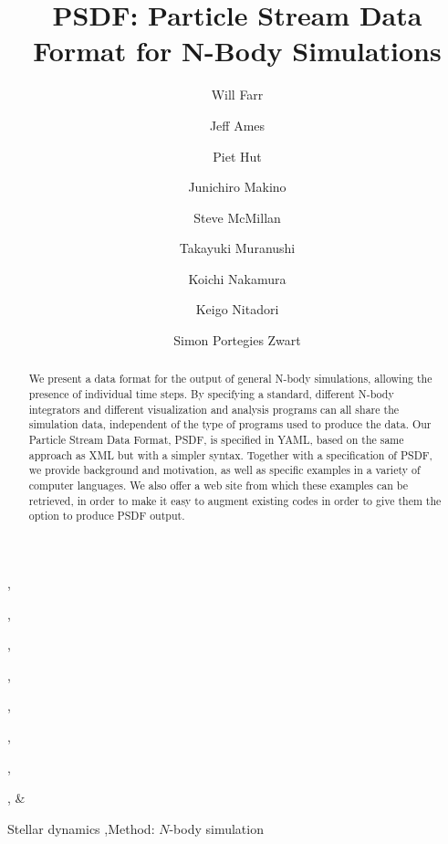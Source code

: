 \documentclass{elsart5p}
\begin{document}
\begin{frontmatter}



\title{PSDF: Particle Stream Data Format for N-Body Simulations}


\author[xx1]{Will Farr},
\author[xx2]{Jeff Ames},
\author[Princeton]{Piet Hut},
\author[UTokyoTech]{Junichiro Makino},
\author[xx3]{Steve McMillan},
\author[xx4]{Takayuki Muranushi},
\author[xx5]{Koichi Nakamura},
\author[xx6]{Keigo Nitadori}, \&
\author[xx7]{Simon Portegies Zwart}

\address[UTokyoTech]{Interactive Research Center of Science, Graduate
  School of Science and Engineering Tokyo Institute of Technology,
  2--12--1 Ookayama, Meguro, Tokyo 152-8551, Japan}
\address[Princeton]{Institute for Advanced Study, Princeton, NJ 08540,
  USA}
\address[xx1]{xxx xxx xxx}
\address[xx2]{xxx xxx xxx}
\address[xx3]{xxx xxx xxx}
\address[xx4]{xxx xxx xxx}
\address[xx5]{xxx xxx xxx}
\address[xx6]{xxx xxx xxx}
\address[xx7]{xxx xxx xxx}

\begin{abstract}
  We present a data format for the output of general N-body simulations,
  allowing the presence of individual time steps.  By specifying a standard,
  different N-body integrators and different visualization and analysis
  programs can all share the simulation data, independent of the type of
  programs used to produce the data.  Our Particle Stream Data Format,
  PSDF, is specified in YAML, based on the same approach as XML but
  with a simpler syntax.  Together with a specification of PSDF, we
  provide background and motivation, as well as specific examples in a
  variety of computer languages.  We also offer a web site from which
  these examples can be retrieved, in order to make it easy to augment
  existing codes in order to give them the option to produce PSDF output.
\end{abstract}

\begin{keyword}
Stellar dynamics \sep Method: $N$-body simulation

\end{keyword}

\end{frontmatter}
\end{document}
